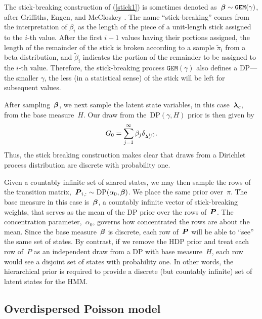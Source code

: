 The stick-breaking construction of (\ref{stick1}) is sometimes denoted
as~${\boldsymbol{\beta} \sim \texttt{GEM}(\gamma)}$, after Griffiths, Engen, and
McCloskey \citep{Ewens90}.  The name ``stick-breaking'' comes from the
interpretation of $\beta_i$ as the length of the piece of a
unit-length stick assigned to the $i$-th value.  After the first $i-1$
values having their portions assigned, the length of the remainder of
the stick is broken according to a sample $\tilde{\pi}_i$ from a beta
distribution, and $\tilde{\beta}_i$ indicates the portion of the
remainder to be assigned to the $i$-th value. Therefore, the
stick-breaking process $\texttt{GEM}(\gamma)$ also defines a DP---the
smaller $\gamma$, the less (in a statistical sense) of the stick will
be left for subsequent values.

After sampling~$\boldsymbol{\beta}$, we next sample the latent state variables, in
this case~${\boldsymbol{\lambda}_c}$, from the base measure~$H$. Our draw from
the~${\mathrm{DP}(\gamma,H)}$ prior is then given by
\begin{align}
G_0=\sum_{j=1}^\infty \beta_j \delta_{\boldsymbol{\lambda}_{c}^{(j)}}.
\end{align}
Thus, the stick breaking construction makes clear that draws from a
Dirichlet process distribution are discrete with probability one.

Given a countably infinite set of shared states, we may then sample
the rows of the transition
matrix,~${\boldsymbol{P}_{i,:}\sim\mathrm{DP}(\alpha_0,\boldsymbol{\beta})}$. We place the
same prior over~$\pi$.  The base measure in this case is~$\boldsymbol{\beta}$, a
countably infinite vector of stick-breaking weights, that serves as
the mean of the DP prior over the rows of~$\boldsymbol{P}$. The concentration
parameter,~$\alpha_0$, governs how concentrated the rows are about the
mean. Since the base measure~$\boldsymbol{\beta}$ is discrete, each row of~$\boldsymbol{P}$
will be able to ``see'' the same set of states. By contrast, if we
remove the HDP prior and treat each row of~$P$ as an independent draw
from a DP with base measure~$H$, each row would see a disjoint set of
states with probability one. In other words, the hierarchical prior is
required to provide a discrete (but countably infinite) set of latent
states for the HMM.

\subsection{Overdispersed Poisson model}


